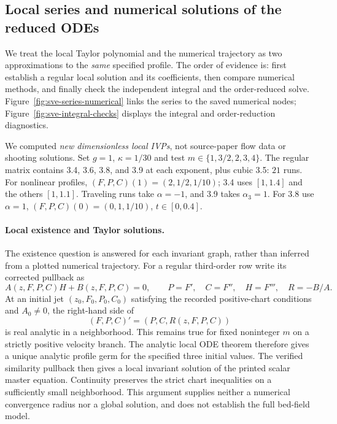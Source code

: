 \subsection{Local series and numerical solutions of the reduced ODEs}
We treat the local Taylor polynomial and the numerical trajectory as two
approximations to the \emph{same} specified profile. The order of evidence is:
first establish a regular local solution and its coefficients, then compare
numerical methods, and finally check the independent integral and the
order-reduced solve. Figure~\ref{fig:sve-series-numerical} links the series to
the saved numerical nodes; Figure~\ref{fig:sve-integral-checks} displays the
integral and order-reduction diagnostics.

We computed \emph{new dimensionless local IVPs}, not source-paper flow data
or shooting solutions. Set $g=1$, $\kappa=1/30$ and test
$m\in\{1,3/2,2,3,4\}$. The regular matrix contains 3.4, 3.6, 3.8,
and 3.9 at each exponent, plus cubic 3.5: $21$ runs. For nonlinear
profiles, $(F,P,C)(1)=(2,1/2,1/10)$; 3.4 uses $[1,1.4]$ and the
others $[1,1.1]$. Traveling runs take $\alpha=-1$, and 3.9 takes
$\alpha_3=1$. For 3.8 use $\alpha=1$,
$(F,P,C)(0)=(0,1,1/10)$, $t\in[0,0.4]$.

\paragraph{Local existence and Taylor solutions.}
The existence question is answered for each invariant graph, rather than
inferred from a plotted numerical trajectory. For a regular third-order row
write its corrected pullback as
\[
 A(z,F,P,C)H+B(z,F,P,C)=0,\qquad
 P=F',\quad C=F'',\quad H=F''',\quad R=-B/A.
\]
At an initial jet $(z_0,F_0,P_0,C_0)$ satisfying the recorded positive-chart
conditions and $A_0\ne0$, the right-hand side of
\[
 (F,P,C)'=(P,C,R(z,F,P,C))
\]
is real analytic in a neighborhood. This remains true for fixed noninteger
$m$ on a strictly positive velocity branch. The analytic local ODE theorem
\cite[Section~4.1]{teschl2012}
therefore gives a unique analytic profile germ for the specified three
initial values. The verified similarity pullback then gives a local invariant
solution of the printed scalar master equation. Continuity preserves the
strict chart inequalities on a sufficiently small neighborhood. This
argument supplies neither a numerical convergence radius nor a global
solution, and does not establish the full bed-field model.

